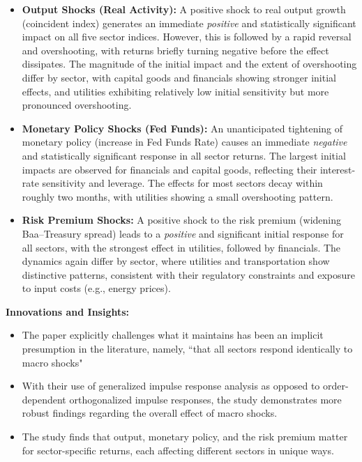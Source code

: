 \documentclass{article}
\begin{document}
\begin{itemize}
    \item \textbf{Output Shocks (Real Activity):}  
    A positive shock to real output growth (coincident index) generates an immediate \textit{positive} and statistically significant impact on all five sector indices. However, this is followed by a rapid reversal and overshooting, with returns briefly turning negative before the effect dissipates. The magnitude of the initial impact and the extent of overshooting differ by sector, with capital goods and financials showing stronger initial effects, and utilities exhibiting relatively low initial sensitivity but more pronounced overshooting.
    
    \item \textbf{Monetary Policy Shocks (Fed Funds):}  
    An unanticipated tightening of monetary policy (increase in Fed Funds Rate) causes an immediate \textit{negative} and statistically significant response in all sector returns. The largest initial impacts are observed for financials and capital goods, reflecting their interest-rate sensitivity and leverage. The effects for most sectors decay within roughly two months, with utilities showing a small overshooting pattern.
    
    \item \textbf{Risk Premium Shocks:}  
    A positive shock to the risk premium (widening Baa–Treasury spread) leads to a \textit{positive} and significant initial response for all sectors, with the strongest effect in utilities, followed by financials. The dynamics again differ by sector, where utilities and transportation show distinctive patterns, consistent with their regulatory constraints and exposure to input costs (e.g., energy prices).
\end{itemize}

\vspace{0.5em}

\noindent \textbf{Innovations and Insights:}

\begin{itemize}
    \item The paper explicitly challenges what it maintains has been an implicit presumption in the literature, namely, ``that all sectors respond identically to macro shocks"
    \item With their use of generalized impulse response analysis as opposed to order-dependent orthogonalized impulse responses, the study demonstrates more robust findings regarding the overall effect of macro shocks.
    \item The study finds that output, monetary policy, and the risk premium matter for sector-specific returns, each affecting different sectors in unique ways.
\end{itemize}
\end{document}
